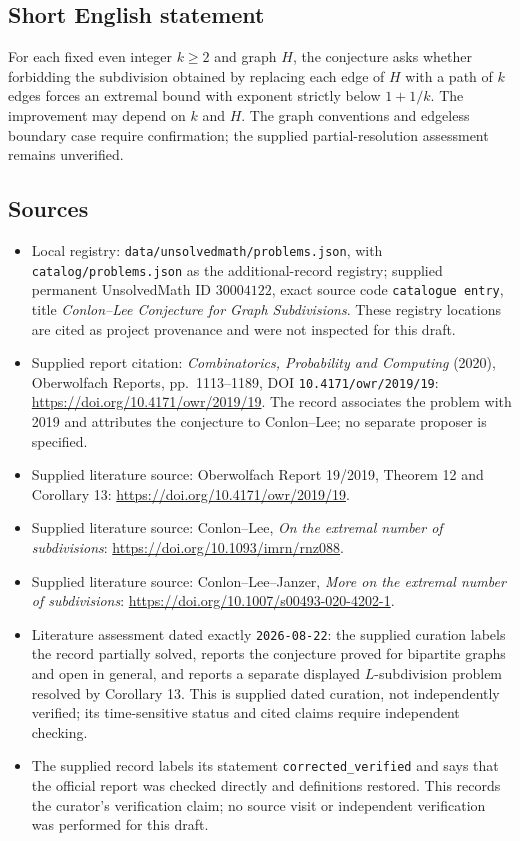 \documentclass[11pt]{article}
\begin{document}
\subsection{Short English statement}
For each fixed even integer \(k\geq2\) and graph \(H\), the conjecture asks whether forbidding the subdivision obtained by replacing each edge of \(H\) with a path of \(k\) edges forces an extremal bound with exponent strictly below \(1+1/k\). The improvement may depend on \(k\) and \(H\). The graph conventions and edgeless boundary case require confirmation; the supplied partial-resolution assessment remains unverified.
\subsection{Sources}
\begin{itemize}
\item Local registry: \texttt{data/unsolvedmath/problems.json}, with \texttt{catalog/problems.json} as the additional-record registry; supplied permanent UnsolvedMath ID \(30004122\), exact source code \texttt{catalogue entry}, title \emph{Conlon--Lee Conjecture for Graph Subdivisions}. These registry locations are cited as project provenance and were not inspected for this draft.
\item Supplied report citation: \emph{Combinatorics, Probability and Computing} (2020), Oberwolfach Reports, pp.\ 1113--1189, DOI \texttt{10.4171/owr/2019/19}: \url{https://doi.org/10.4171/owr/2019/19}. The record associates the problem with 2019 and attributes the conjecture to Conlon--Lee; no separate proposer is specified.
\item Supplied literature source: Oberwolfach Report 19/2019, Theorem 12 and Corollary 13: \url{https://doi.org/10.4171/owr/2019/19}.
\item Supplied literature source: Conlon--Lee, \emph{On the extremal number of subdivisions}: \url{https://doi.org/10.1093/imrn/rnz088}.
\item Supplied literature source: Conlon--Lee--Janzer, \emph{More on the extremal number of subdivisions}: \url{https://doi.org/10.1007/s00493-020-4202-1}.
\item Literature assessment dated exactly \texttt{2026-08-22}: the supplied curation labels the record partially solved, reports the conjecture proved for bipartite graphs and open in general, and reports a separate displayed \(L\)-subdivision problem resolved by Corollary 13. This is supplied dated curation, not independently verified; its time-sensitive status and cited claims require independent checking.
\item The supplied record labels its statement \texttt{corrected\_verified} and says that the official report was checked directly and definitions restored. This records the curator's verification claim; no source visit or independent verification was performed for this draft.
\end{itemize}
\end{document}
